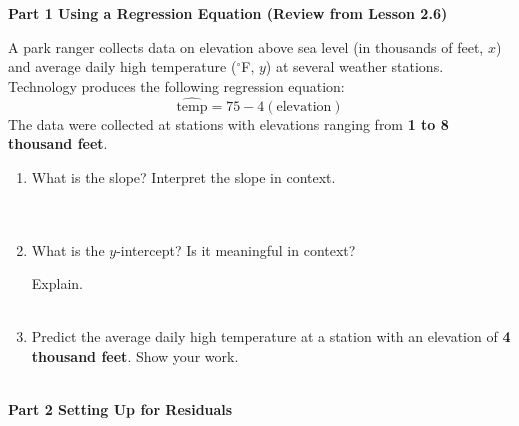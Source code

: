 \documentclass[10pt]{article}
\begin{document}
\namedateperiod

\vspace{0.3in}

{\large\bfseries\color{navy} Part 1 \quad Using a Regression Equation (Review from Lesson 2.6)}

\vspace{0.12in}
\noindent A park ranger collects data on elevation above sea level (in thousands of feet, $x$)
and average daily high temperature ($^\circ$F, $y$) at several weather stations. Technology
produces the following regression equation:
\[
  \widehat{\text{temp}} = 75 - 4(\text{elevation})
\]
The data were collected at stations with elevations ranging from \textbf{1 to 8 thousand feet}.

\vspace{0.12in}

\begin{enumerate}[leftmargin=1.6em, itemsep=0.22in]

  \item What is the slope? \blank{3cm} \quad Interpret the slope in context.\\[8pt]
        \writeline\\[2pt]\writeline\\[2pt]\writeline

  \item What is the $y$-intercept? \blank{3cm} \quad Is it meaningful in context? \blank{2cm}

        Explain.\\[8pt]
        \writeline\\[2pt]\writeline

  \item Predict the average daily high temperature at a station with an elevation of
        \textbf{4 thousand feet}. Show your work.\\[8pt]
        \writeline\\[2pt]\writeline

\end{enumerate}

\vspace{0.22in}

{\large\bfseries\color{navy} Part 2 \quad Setting Up for Residuals}

\vspace{0.12in}
\end{document}
